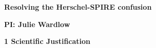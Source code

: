 \documentclass[12pt,a4paper]{article}
\begin{document}
\pagestyle{plain}
 

\begin{center}
{\LARGE{\bf
{Resolving the Herschel-SPIRE confusion}
}}
\end{center}

\centerline{\bf PI: 
{Julie Wardlow}}



{\large{\bf1 Scientific Justification}}
\end{document}
